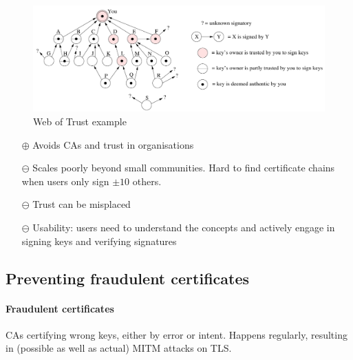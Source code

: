 \begin{figure}[h]
    \centering
    \includegraphics[width=16cm]{images/ch10-pgp-web-of-trust-example.png}
    \caption{Web of Trust example}
    \label{fig:pgp-web-of-trust}
\end{figure}
\begin{itemize}
    \item[$\oplus$] Avoids CAs and trust in organisations
    \item[$\ominus$] Scales poorly beyond small communities. Hard to find certificate chains when users only sign $\pm 10$ others.
    \item[$\ominus$] Trust can be misplaced
    \item[$\ominus$] Usability: users need to understand the concepts and actively engage in signing keys and verifying signatures
\end{itemize}

\subsection{Preventing fraudulent certificates}

\paragraph{Fraudulent certificates} CAs certifying wrong keys, either by error or intent. Happens regularly, resulting in (possible as well as actual) MITM attacks on TLS.

